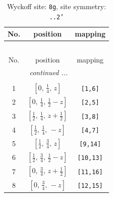 \documentclass[fleqn,8pt]{jsarticle}
\begin{document}
\begin{longtable}{ccc}
\caption{Wyckoff site: {\tt 8g}, site symmetry: {\tt ..2'}}
 \\
 \hline \hline
No. & position & mapping \\ \hline \endfirsthead

\multicolumn{2}{l}{\tablename\ \thetable{}} \\
 \hline \hline
No. & position & mapping \\ \hline \endhead

 \hline \hline
\multicolumn{2}{r}{\footnotesize\it continued ...} \\ \endfoot

 \hline \hline
\multicolumn{2}{r}{} \\ \endlastfoot

1 & $\left[ 0,\, \frac{1}{4},\, z \right]$ & {\tt [1,6]} \\ \hline
2 & $\left[ 0,\, \frac{1}{4},\, \frac{1}{2} - z \right]$ & {\tt [2,5]} \\ \hline
3 & $\left[ \frac{1}{2},\, \frac{1}{4},\, z + \frac{1}{2} \right]$ & {\tt [3,8]} \\ \hline
4 & $\left[ \frac{1}{2},\, \frac{1}{4},\, - z \right]$ & {\tt [4,7]} \\ \hline
5 & $\left[ \frac{1}{2},\, \frac{3}{4},\, z \right]$ & {\tt [9,14]} \\ \hline
6 & $\left[ \frac{1}{2},\, \frac{3}{4},\, \frac{1}{2} - z \right]$ & {\tt [10,13]} \\ \hline
7 & $\left[ 0,\, \frac{3}{4},\, z + \frac{1}{2} \right]$ & {\tt [11,16]} \\ \hline
8 & $\left[ 0,\, \frac{3}{4},\, - z \right]$ & {\tt [12,15]} \\
\end{longtable}
\renewcommand{\arraystretch}{1.2}
\end{document}
